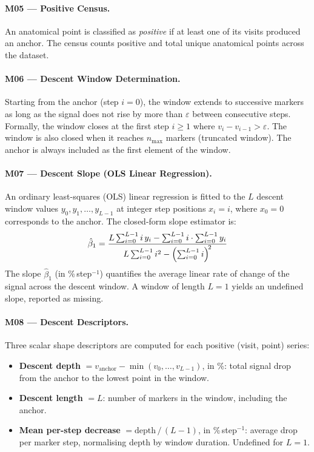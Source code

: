 \documentclass[a4paper,11pt]{article}
\begin{document}
\paragraph{M05 --- Positive Census.}
An anatomical point is classified as \emph{positive} if at least one of its visits produced
an anchor. The census counts positive and total unique anatomical points across the dataset.

\paragraph{M06 --- Descent Window Determination.}
Starting from the anchor (step $i = 0$), the window extends to successive markers as long
as the signal does not rise by more than $\varepsilon$ between consecutive steps.
Formally, the window closes at the first step $i \geq 1$ where
$v_i - v_{i-1} > \varepsilon$.
The window is also closed when it reaches $n_{\max}$ markers (truncated window).
The anchor is always included as the first element of the window.

\paragraph{M07 --- Descent Slope (OLS Linear Regression).}
An ordinary least-squares (OLS) linear regression is fitted to the $L$ descent window
values $y_0, y_1, \ldots, y_{L-1}$ at integer step positions $x_i = i$, where
$x_0 = 0$ corresponds to the anchor.
The closed-form slope estimator is:
\[
  \hat{\beta}_1 =
  \frac{L\sum_{i=0}^{L-1} i\,y_i
        - \sum_{i=0}^{L-1} i \cdot \sum_{i=0}^{L-1} y_i}
       {L\sum_{i=0}^{L-1} i^2
        - \Bigl(\sum_{i=0}^{L-1} i\Bigr)^{\!2}}
\]
The slope $\hat{\beta}_1$ (in \%\,step$^{-1}$) quantifies the average linear rate of
change of the signal across the descent window. A window of length $L = 1$ yields an
undefined slope, reported as missing.

\paragraph{M08 --- Descent Descriptors.}
Three scalar shape descriptors are computed for each positive (visit, point) series:
\begin{itemize}
  \item \textbf{Descent depth} $= v_{\mathrm{anchor}} - \min(v_0, \ldots, v_{L-1})$,
        in \%: total signal drop from the anchor to the lowest point in the window.
  \item \textbf{Descent length} $= L$: number of markers in the window, including the
        anchor.
  \item \textbf{Mean per-step decrease} $= \mathrm{depth}\,/\,(L - 1)$,
        in \%\,step$^{-1}$: average drop per marker step, normalising depth by window
        duration. Undefined for $L = 1$.
\end{itemize}
\end{document}

